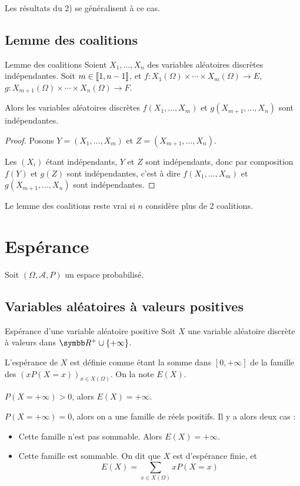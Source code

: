 Les résultats du 2) se généralisent à ce cas. 

\subsection{Lemme des coalitions} 

\begin{theoreme}{Lemme des coalitions}{}
    Soient $X_1, \dots, X_n$ des variables aléatoires discrètes indépendantes. 
    Soit $m \in [\![1, n - 1]\!]$, et $f : X_1(\Omega) \times \cdots \times X_m(\Omega) \to E$,
    $g : X_{m + 1}(\Omega) \times \cdots \times X_n(\Omega) \to F$.

    Alors les variables aléatoires discrètes $f(X_1, \dots, X_m)$ et $g(X_{m + 1}, \dots, X_n)$ sont indépendantes.
\end{theoreme}

\begin{proof}
    Posons $Y = (X_1, \dots, X_m)$ et $Z = (X_{m + 1}, \dots, X_n)$.

    Les $(X_i)$ étant indépendants, $Y$ et $Z$ sont indépendants, donc par composition $f(Y)$ et $g(Z)$ sont indépendantes,
    c'est à dire $f(X_1, \dots, X_m)$ et $g(X_{m + 1}, \dots, X_n)$ sont indépendantes.
\end{proof}

\begin{proposition}{}{}
    Le lemme des coalitions reste vrai si $n$ considère plus de 2 coalitions. 
\end{proposition}

\section{Espérance}
Soit $(\Omega, \mathcal A, P)$ un espace probabilisé. 

\subsection{Variables aléatoires à valeurs positives}

\begin{definition}{Espérance d'une variable aléatoire positive}{}
    Soit $X$ une variable aléatoire discrète à valeurs dans $\R^+ \cup \{+\infty\}$.

    L'espérance de $X$ est définie comme étant la somme dans $[0, + \infty]$ 
    de la famille des $(x P(X = x) )_{x \in X(\Omega)}$. On la note $E(X)$.

     $P(X = + \infty) > 0$, alors $E(X) = + \infty$.

     $P(X = + \infty) = 0$, alors on a une famille de réels positifs. 
    Il y a alors deux cas : 
    \begin{itemize}
        \item Cette famille n'est pas sommable. Alors $E(X) = + \infty$.
        \item Cette famille est sommable. On dit que $X$ est d'espérance finie, et 
        $$ E(X) = \sum_{x \in X(\Omega)} x P(X = x) $$
    \end{itemize}
\end{definition}


